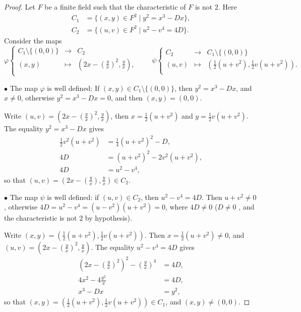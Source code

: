 \documentclass[11pt,a4paper]{article}
\begin{document}
\begin{proof} Let $F$ be a finite field such that the characteristic of $F$ is not $2$. Here
\begin{align*}
C_1 &= \{(x,y) \in F^2 \mid y^2 = x^3 -Dx\},\\
C_2 &=\{(u,v) \in F^2 \mid u^2 - v^4 = 4D\}.
\end{align*}
Consider the maps
$$
\varphi
\left\{
\begin{array}{ccl}
C_1 \setminus \{(0,0)\} & \to & C_2\\
(x,y) & \mapsto &\left(2x - \left(\frac{y}{x} \right)^2, \frac{y}{x}\right),\\
\end{array}
\right.
\qquad
\psi
\left\{
\begin{array}{ccl}
C_2  & \to & C_1 \setminus \{(0,0)\}\\
(u,v) & \mapsto & \left(\frac{1}{2}(u+v^2), \frac{1}{2} v (u+v^2)\right).\\
\end{array}
\right.
$$

$\bullet$ The map $\varphi$ is  well defined: If $(x,y) \in C_1 \setminus \{(0,0)\}$, then 
$y^2 = x^3 - Dx$, and $x \ne 0$, otherwise $y^2 = x^3 - Dx = 0$, and then $(x,y) = (0,0)$. 

Write $(u,v) = \left(2x - \left(\frac{y}{x} \right)^2, \frac{y}{x}\right)$, then
 $x = \frac{1}{2}(u+v^2)$ and $y = \frac{1}{2} v(u+v^2)$. The equality $y^2 = x^3 - Dx$ gives 
\begin{align*}
\frac{1}{2} v^2(u+v^2) &= \frac{1}{4} (u + v^2)^2 - D,\\
4D &= (u+v^2)^2 - 2 v^2(u+v^2),\\
4D &= u^2 - v^4, 
\end{align*}
so that $(u,v) = \left(2x - \left(\frac{y}{x} \right), \frac{y}{x}\right) \in C_2$.

$\bullet$ The map $\psi$ is well defined: if $(u,v) \in C_2$, then $u^2 - v^4 = 4D$. Then $u + v^2 \ne 0$, otherwise $4D = u^2 - v^4 = (u-v^2)(u+v^2) =0$, where $4D \ne 0$ ($D \ne 0$ , and the characteristic is not $2$ by hypothesis).

 Write $(x,y) = \left(\frac{1}{2}(u+v^2), \frac{1}{2} v (u+v^2)\right)$. Then $x =\frac{1}{2}(u+v^2) \ne 0$, and $(u,v) = \left(2x - \left(\frac{y}{x} \right)^2, \frac{y}{x}\right)$.
The equality $u^2 - v^4 = 4D$ gives
\begin{align*}
\left(2x - \left(\frac{y}{x} \right)^2\right)^2 -  \left(\frac{y}{x}\right)^4&= 4D,\\
 4x^2 - 4 \frac{y^2}{x}&= 4D,\\
x^3 - Dx &= y^2,
\end{align*}
so that $(x,y) = \left(\frac{1}{2}(u+v^2), \frac{1}{2} v (u+v^2)\right) \in C_1$, and $(x,y) \ne (0,0)$.


\end{proof}
\end{document}
